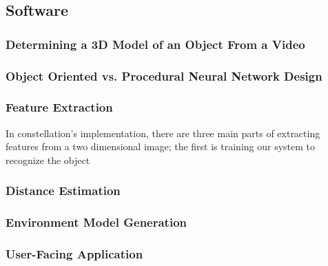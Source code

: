 \subsection{Software}
\subsubsection{Determining a 3D Model of an Object From a Video}
\subsubsection{Object Oriented vs. Procedural Neural Network Design}
\subsubsection{Feature Extraction}
In constellation's implementation, there are three main parts of extracting features from a two dimensional image; the first is training our system to recognize the object

\subsubsection{Distance Estimation}
\subsubsection{Environment Model Generation}
\subsubsection{User-Facing Application}